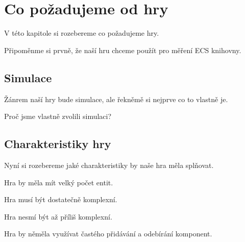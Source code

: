 \chapter{Co požadujeme od hry}
V této kapitole si rozebereme co požadujeme hry.

Připoměnme si prvně, že naší hru chceme použít pro měření ECS knihovny.

\section{Simulace}
Žánrem naší hry bude simulace, ale řekněmě si nejprve co to vlastně je.


Proč jsme vlastně zvolili simulaci?


\section{Charakteristiky hry}
Nyní si rozebereme jaké charakteristiky by naše hra měla splňovat.

Hra by měla mít velký počet entit.

Hra musí být dostatečně komplexní.

Hra nesmí být až příliš komplexní.

Hra by něměla využívat častého přidávání a odebírání komponent.

